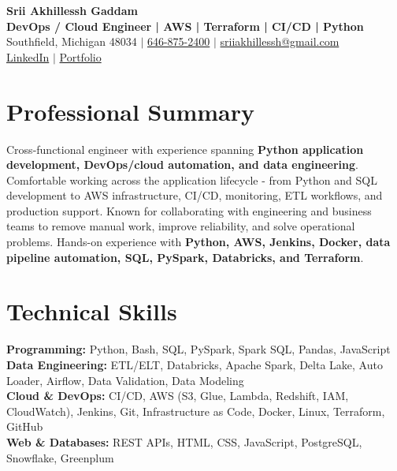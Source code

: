 \documentclass[letterpaper,10pt]{article}
\begin{document}
\fontsize{9.35pt}{10.45pt}\selectfont

\begin{center}
    {\LARGE \textbf{Srii Akhillessh Gaddam}} \\[-1pt]
    \textbf{DevOps / Cloud Engineer | AWS | Terraform | CI/CD | Python} \\[2pt]
    Southfield, Michigan 48034 $|$
    \href{tel:6468752400}{646-875-2400} $|$
    \href{mailto:sriiakhillessh@gmail.com}{sriiakhillessh@gmail.com} \\[1pt]
    \href{https://www.linkedin.com/in/srii-akhiilessh-gaddam-b48668191/}{LinkedIn} $|$
    \href{https://sriiakhillesshg.github.io/portfolio/}{Portfolio}
\end{center}
\vspace{-8pt}

\section{Professional Summary}
\small{Cross-functional engineer with experience spanning \textbf{Python application development, DevOps/cloud automation, and data engineering}. Comfortable working across the application lifecycle - from Python and SQL development to AWS infrastructure, CI/CD, monitoring, ETL workflows, and production support. Known for collaborating with engineering and business teams to remove manual work, improve reliability, and solve operational problems. Hands-on experience with \textbf{Python, AWS, Jenkins, Docker, data pipeline automation, SQL, PySpark, Databricks, and Terraform}.}

\section{Technical Skills}
\small{
\textbf{Programming:} Python, Bash, SQL, PySpark, Spark SQL, Pandas, JavaScript \\
\textbf{Data Engineering:} ETL/ELT, Databricks, Apache Spark, Delta Lake, Auto Loader, Airflow, Data Validation, Data Modeling \\
\textbf{Cloud \& DevOps:} CI/CD, AWS (S3, Glue, Lambda, Redshift, IAM, CloudWatch), Jenkins, Git, Infrastructure as Code, Docker, Linux, Terraform, GitHub \\
\textbf{Web \& Databases:} REST APIs, HTML, CSS, JavaScript, PostgreSQL, Snowflake, Greenplum
}
\end{document}
